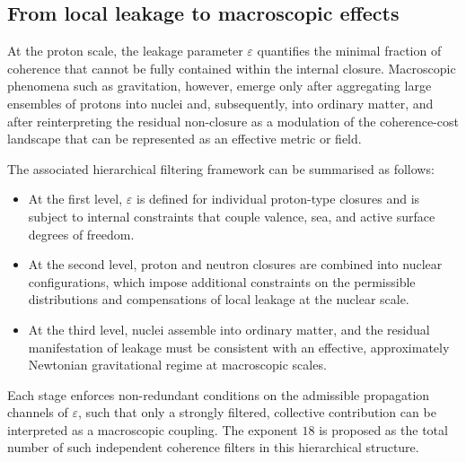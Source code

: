 \documentclass[11pt,a4paper]{article}
\theoremstyle{definition}
\begin{document}
\subsection{From local leakage to macroscopic effects}

At the proton scale, the leakage parameter $\varepsilon$ quantifies the minimal fraction of coherence that cannot be fully contained within the internal closure.\cite{Topological_Reformulation_PDL_2026} Macroscopic phenomena such as gravitation, however, emerge only after aggregating large ensembles of protons into nuclei and, subsequently, into ordinary matter, and after reinterpreting the residual non-closure as a modulation of the coherence-cost landscape that can be represented as an effective metric or field.\cite{PDL_Main_2026,Effective_Fields_PDL_2026}

The associated hierarchical filtering framework can be summarised as follows:
\begin{itemize}
  \item At the first level, $\varepsilon$ is defined for individual proton-type closures and is subject to internal constraints that couple valence, sea, and active surface degrees of freedom.
  \item At the second level, proton and neutron closures are combined into nuclear configurations, which impose additional constraints on the permissible distributions and compensations of local leakage at the nuclear scale.
  \item At the third level, nuclei assemble into ordinary matter, and the residual manifestation of leakage must be consistent with an effective, approximately Newtonian gravitational regime at macroscopic scales.\cite{Exponent_18_PDL_2026,PDL_Global_Mapping_2026}
\end{itemize}

Each stage enforces non-redundant conditions on the admissible propagation channels of $\varepsilon$, such that only a strongly filtered, collective contribution can be interpreted as a macroscopic coupling. The exponent $18$ is proposed as the total number of such independent coherence filters in this hierarchical structure.\cite{Exponent_18_PDL_2026}
\end{document}
